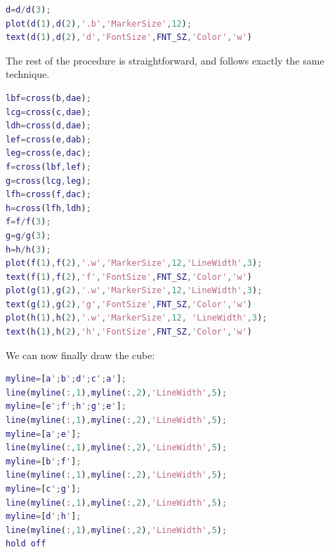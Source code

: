 \documentclass[12pt, a4paper]{report}
\newtheorem[style=M,bodystyle=\normalfont]{theorem}{Theorem}
\newtheorem[style=M,bodystyle=\normalfont]{corollary}{Corollary}
\newtheorem[style=M,bodystyle=\normalfont]{lemma}{Lemma}
\newtheorem[style=M,bodystyle=\normalfont]{definition}{Definition}
\begin{document}
\begin{Answer}[ref=2]
        \begin{lstlisting}[language=Matlab]
d=d/d(3);
plot(d(1),d(2),'.b','MarkerSize',12);
text(d(1),d(2),'d','FontSize',FNT_SZ,'Color','w')
        \end{lstlisting}
        The rest of the procedure is straightforward, and follows exactly the same technique.
        \begin{lstlisting}[language=Matlab]
lbf=cross(b,dae);
lcg=cross(c,dae);
ldh=cross(d,dae);
lef=cross(e,dab);
leg=cross(e,dac);
f=cross(lbf,lef);
g=cross(lcg,leg);
lfh=cross(f,dac);
h=cross(lfh,ldh);
f=f/f(3);
g=g/g(3);
h=h/h(3);
plot(f(1),f(2),'.w','MarkerSize',12,'LineWidth',3); 
text(f(1),f(2),'f','FontSize',FNT_SZ,'Color','w')
plot(g(1),g(2),'.w','MarkerSize',12,'LineWidth',3); 
text(g(1),g(2),'g','FontSize',FNT_SZ,'Color','w')
plot(h(1),h(2),'.w','MarkerSize',12, 'LineWidth',3);
text(h(1),h(2),'h','FontSize',FNT_SZ,'Color','w')
        \end{lstlisting}
        We can now finally draw the cube: 
        \begin{lstlisting}[language=Matlab]
myline=[a';b';d';c';a'];
line(myline(:,1),myline(:,2),'LineWidth',5);
myline=[e';f';h';g';e'];
line(myline(:,1),myline(:,2),'LineWidth',5);
myline=[a';e'];
line(myline(:,1),myline(:,2),'LineWidth',5);
myline=[b';f'];
line(myline(:,1),myline(:,2),'LineWidth',5);
myline=[c';g'];
line(myline(:,1),myline(:,2),'LineWidth',5);
myline=[d';h'];
line(myline(:,1),myline(:,2),'LineWidth',5);
hold off
        \end{lstlisting}
    \end{Answer}
\end{document}

